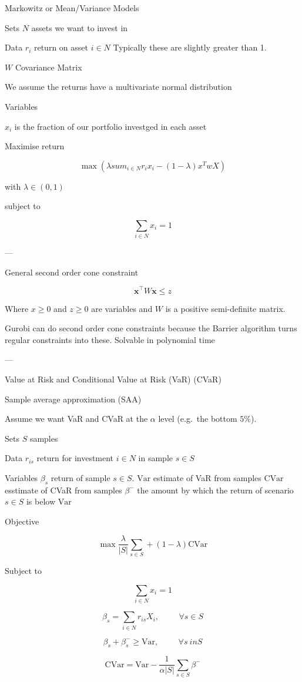 Markowitz or Mean/Variance Models

Sets
$N$ assets we want to invest in

Data
$r_i$ return on asset $i \in N$
Typically these are slightly greater than 1.

$W$ Covariance Matrix

We assume the returns have a multivariate normal distribution

Variables

$x_i$ is the fraction of our portfolio investged in each asset

Maximise return

\[\max (\lambda sum_{i\in N} r_i x_i - (1-\lambda) x^T w X)\]

with
$\lambda \in (0,1)$

subject to

\[\sum_{i\in N} x_i = 1\]

---

General second order cone constraint

\[\boldsymbol{x}^\top W \boldsymbol{x} \le z\]

Where $x\ge 0$ and $z \ge 0$ are variables and $W$ is a positive semi-definite matrix.



Gurobi can do second order cone constraints because the Barrier algorithm turns regular constraints into these.
Solvable in polynomial time

---

Value at Risk and Conditional Value at Risk
(VaR) (CVaR)

Sample average approximation (SAA)

Assume we want VaR and CVaR at the $\alpha$ level (e.g.\ the bottom $5\%$).

Sets
$S$ samples

Data
$r_{is}$ return for investment $i \in N$ in sample $s \in S$

Variables
$\beta_s$ return of sample $s \in S$.
$\text{Var}$ estimate of VaR from samples
$\text{CVar}$ esstimate of CVaR from samples
$\beta^{-}$ the amount by which the return of scenario $s \in S$ is below $\text{Var}$

Objective

\[ \max \frac{\lambda}{|S|} \sum_{s \in S} + (1 - \lambda)\text{CVar} \]

Subject to

\[ \sum_{i\in N} x_i = 1 \]

\[ \beta_s = \sum_{ i \in N } r_{is} X_i, \hspace{1cm} \forall s \in S \]

\[ \beta_s + \beta_s^{-} \ge \text{Var}, \hspace{1cm} \forall s \ in S \]

\[ \text{CVar} = \text{Var} - \frac{1}{\alpha |S|} \sum_{s \in S} \beta^{-} \]

